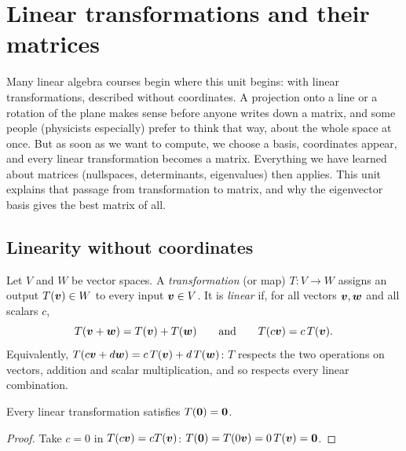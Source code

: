\section{Linear transformations and their matrices}\label{sec:u34}

Many linear algebra courses begin where this unit begins: with linear transformations,
described without coordinates. A projection onto a line or a rotation of the plane makes sense
before anyone writes down a matrix, and some people (physicists especially) prefer to think
that way, about the whole space at once. But as soon as we want to compute, we choose a basis,
coordinates appear, and every linear transformation becomes a matrix. Everything we have
learned about matrices (nullspaces, determinants, eigenvalues) then applies. This unit
explains that passage from transformation to matrix, and why the eigenvector basis gives the
best matrix of all.

\subsection{Linearity without coordinates}

\begin{definition}\label{def:u34-linear}
Let $V$ and $W$ be vector spaces. A \emph{transformation} (or map) $T\colon V\to W$ assigns an
output $T(\boldsymbol{v})\in W$ to every input $\boldsymbol{v}\in V$. It is \emph{linear} if, for all vectors
$\boldsymbol{v},\boldsymbol{w}$ and all scalars $c$,
\[
  T(\boldsymbol{v}+\boldsymbol{w})=T(\boldsymbol{v})+T(\boldsymbol{w})\qquad\text{and}\qquad T(c\boldsymbol{v})=c\,T(\boldsymbol{v}).
\]
Equivalently, $T(c\boldsymbol{v}+d\boldsymbol{w})=c\,T(\boldsymbol{v})+d\,T(\boldsymbol{w})$: $T$ respects the two operations on vectors,
addition and scalar multiplication, and so respects every linear combination.
\end{definition}

\begin{proposition}\label{prop:u34-zero}
Every linear transformation satisfies $T(\boldsymbol{0})=\boldsymbol{0}$.
\end{proposition}
\begin{proof}
Take $c=0$ in $T(c\boldsymbol{v})=cT(\boldsymbol{v})$: $T(\boldsymbol{0})=T(0\boldsymbol{v})=0\,T(\boldsymbol{v})=\boldsymbol{0}$.
\end{proof}

